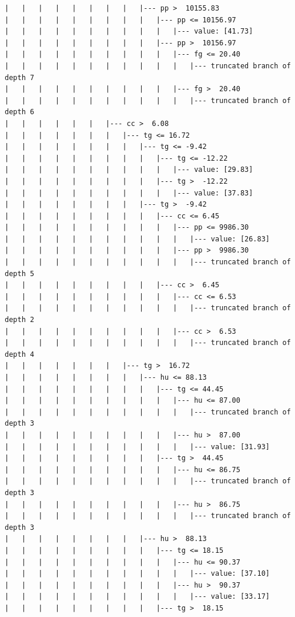 \documentclass[UTF8, a4paper]{ctexart}
\begin{document}
\begin{lstlisting}
|   |   |   |   |   |   |   |   |--- pp >  10155.83
|   |   |   |   |   |   |   |   |   |--- pp <= 10156.97
|   |   |   |   |   |   |   |   |   |   |--- value: [41.73]
|   |   |   |   |   |   |   |   |   |--- pp >  10156.97
|   |   |   |   |   |   |   |   |   |   |--- fg <= 20.40
|   |   |   |   |   |   |   |   |   |   |   |--- truncated branch of depth 7
|   |   |   |   |   |   |   |   |   |   |--- fg >  20.40
|   |   |   |   |   |   |   |   |   |   |   |--- truncated branch of depth 6
|   |   |   |   |   |   |--- cc >  6.08
|   |   |   |   |   |   |   |--- tg <= 16.72
|   |   |   |   |   |   |   |   |--- tg <= -9.42
|   |   |   |   |   |   |   |   |   |--- tg <= -12.22
|   |   |   |   |   |   |   |   |   |   |--- value: [29.83]
|   |   |   |   |   |   |   |   |   |--- tg >  -12.22
|   |   |   |   |   |   |   |   |   |   |--- value: [37.83]
|   |   |   |   |   |   |   |   |--- tg >  -9.42
|   |   |   |   |   |   |   |   |   |--- cc <= 6.45
|   |   |   |   |   |   |   |   |   |   |--- pp <= 9986.30
|   |   |   |   |   |   |   |   |   |   |   |--- value: [26.83]
|   |   |   |   |   |   |   |   |   |   |--- pp >  9986.30
|   |   |   |   |   |   |   |   |   |   |   |--- truncated branch of depth 5
|   |   |   |   |   |   |   |   |   |--- cc >  6.45
|   |   |   |   |   |   |   |   |   |   |--- cc <= 6.53
|   |   |   |   |   |   |   |   |   |   |   |--- truncated branch of depth 2
|   |   |   |   |   |   |   |   |   |   |--- cc >  6.53
|   |   |   |   |   |   |   |   |   |   |   |--- truncated branch of depth 4
|   |   |   |   |   |   |   |--- tg >  16.72
|   |   |   |   |   |   |   |   |--- hu <= 88.13
|   |   |   |   |   |   |   |   |   |--- tg <= 44.45
|   |   |   |   |   |   |   |   |   |   |--- hu <= 87.00
|   |   |   |   |   |   |   |   |   |   |   |--- truncated branch of depth 3
|   |   |   |   |   |   |   |   |   |   |--- hu >  87.00
|   |   |   |   |   |   |   |   |   |   |   |--- value: [31.93]
|   |   |   |   |   |   |   |   |   |--- tg >  44.45
|   |   |   |   |   |   |   |   |   |   |--- hu <= 86.75
|   |   |   |   |   |   |   |   |   |   |   |--- truncated branch of depth 3
|   |   |   |   |   |   |   |   |   |   |--- hu >  86.75
|   |   |   |   |   |   |   |   |   |   |   |--- truncated branch of depth 3
|   |   |   |   |   |   |   |   |--- hu >  88.13
|   |   |   |   |   |   |   |   |   |--- tg <= 18.15
|   |   |   |   |   |   |   |   |   |   |--- hu <= 90.37
|   |   |   |   |   |   |   |   |   |   |   |--- value: [37.10]
|   |   |   |   |   |   |   |   |   |   |--- hu >  90.37
|   |   |   |   |   |   |   |   |   |   |   |--- value: [33.17]
|   |   |   |   |   |   |   |   |   |--- tg >  18.15

\end{lstlisting}
\end{document}
